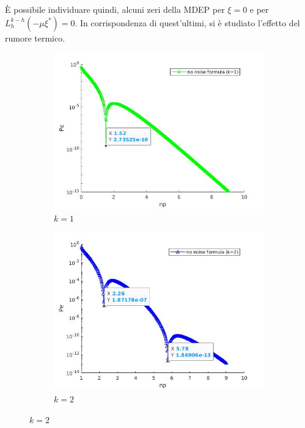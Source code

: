 \documentclass[a4paper,11pt]{article}
\begin{document}
        È possibile individuare quindi, alcuni zeri della MDEP per $\xi=0$ e per $L_h^{k-h}(-\mu\xi^*)=0$. 
        In corrispondenza di quest'ultimi, si è studiato l'effetto del rumore termico.
        
        \begin{figure}[ht]
            \caption{MDEP without noise}
            \begin{subfigure}{0.49\textwidth}
                \includegraphics[width=\linewidth]{k1LaguerreZeros.jpg}
                \caption{$k=1$}
            \end{subfigure}
            \hspace*{\fill}
            \begin{subfigure}{0.49\textwidth}
                \includegraphics[width=\linewidth]{k2LaguerreZeros.jpg}
                \caption{$k=2$}
            \end{subfigure}
            \label{fig:2}
        \end{figure}
\end{document}
